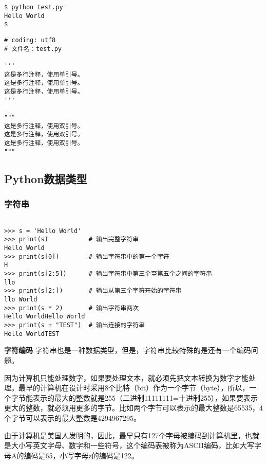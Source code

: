 \documentclass[10pt,a4paper]{ctexbook}
\begin{document}
\begin{verbatim}
$ python test.py
Hello World
$ 
\end{verbatim}


\begin{verbatim}
# coding: utf8
# 文件名：test.py

'''
这是多行注释，使用单引号。
这是多行注释，使用单引号。
这是多行注释，使用单引号。
'''

"""
这是多行注释，使用双引号。
这是多行注释，使用双引号。
这是多行注释，使用双引号。
"""
\end{verbatim}

\subsection{Python数据类型}
\subsubsection{字符串}
\begin{verbatim}

>>> s = 'Hello World'
>>> print(s)           # 输出完整字符串
Hello World
>>> print(s[0])        # 输出字符串中的第一个字符
H
>>> print(s[2:5])      # 输出字符串中第三个至第五个之间的字符串
llo
>>> print(s[2:])       # 输出从第三个字符开始的字符串
llo World
>>> print(s * 2)       # 输出字符串两次
Hello WorldHello World
>>> print(s + "TEST")  # 输出连接的字符串
Hello WorldTEST
\end{verbatim}

\textbf{字符编码}
字符串也是一种数据类型，但是，字符串比较特殊的是还有一个编码问题。

因为计算机只能处理数字，如果要处理文本，就必须先把文本转换为数字才能处理。最早的计算机在设计时采用8个比特（bit）作为一个字节（byte），所以，一个字节能表示的最大的整数就是255（二进制11111111=十进制255），如果要表示更大的整数，就必须用更多的字节。比如两个字节可以表示的最大整数是65535，4个字节可以表示的最大整数是4294967295。

由于计算机是美国人发明的，因此，最早只有127个字母被编码到计算机里，也就是大小写英文字母、数字和一些符号，这个编码表被称为ASCII编码，比如大写字母A的编码是65，小写字母z的编码是122。
\end{document}
